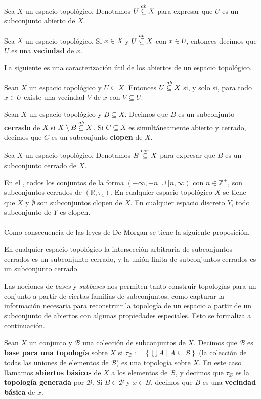 \begin{Not}
    Sea $X$ un espacio topológico. Denotamos $U\stackrel{ab}{\subseteq} X$ para expresar que $U$ es un subconjunto abierto de $X$.
\end{Not}
\begin{Def}
   Sea $X$ un espacio topológico. Si $x\in X$ y $U\stackrel{ab}{\subseteq} X$ con $x\in U$, entonces decimos que $U$ es una \textbf{vecindad} de $x$. 
\end{Def}
La siguiente es una caracterización útil de los abiertos de un espacio topológico.
\begin{Prop}\label{Prop:Caracterizacion_abiertos}
   Sean $X$ un espacio topológico y $U\subseteq X$. Entonces $U\stackrel{ab}{\subseteq} X$ si, y solo si, para todo $x\in U$ existe una vecindad $V$ de $x$ con $V\subseteq U$.
\end{Prop}
\begin{Def}
   Sean $X$ un espacio topológico y $B\subseteq X$. Decimos que $B$ es un subconjunto \textbf{cerrado} de $X$ si $X\setminus B \stackrel{ab}{\subseteq} X$. Si $C\subseteq X$ es simultáneamente abierto y cerrado, decimos que $C$ es un subconjunto \textbf{clopen} de $X$. 
\end{Def}
\begin{Not}
   Sea $X$ un espacio topológico. Denotamos $B\stackrel{cer}{\subseteq} X$ para expresar que $B$ es un subconjunto cerrado de $X$.
\end{Not}
En el , todos los conjuntos de la forma $(-\infty,-n]\cup [n,\infty)$ con $n\in \mathbb{Z}^+$, son subconjuntos cerrados de $(\mathbb{R},\tau_4)$. En cualquier espacio topológico $X$ se tiene que $X$ y $\emptyset$ son subconjuntos clopen de $X$. En cualquier espacio discreto $Y$, todo subconjunto de $Y$ es clopen.\\\\
Como consecuencia de las leyes de De Morgan se tiene la siguiente proposición.
\begin{Prop}
   En cualquier espacio topológico la intersección arbitraria de subconjuntos cerrados es un subconjunto cerrado, y la unión finita de subconjuntos cerrados es un subconjunto cerrado.
\end{Prop}
Las nociones de \textit{bases} y \textit{subbases} nos permiten tanto construir topologías para un conjunto a partir de ciertas familias de subconjuntos, como capturar la información necesaria para reconstruir la topología de un espacio a partir de un subconjunto de abiertos con algunas propiedades especiales. Esto se formaliza a continuación. 
\begin{Def}
   Sean $X$ un conjunto y $\mathcal{B}$ una colección de subconjuntos de $X$. Decimos que $\mathcal{B}$ es \textbf{base para una topología} sobre $X$ si $\tau_\mathcal{B}:=\left\lbrace \bigcup A \mid A\subseteq \mathcal{B}\right\rbrace$ (la colección de todas las uniones de elementos de $\mathcal{B}$) es una topología sobre $X$. En este caso llamamos \textbf{abiertos básicos} de $X$ a los elementos de $\mathcal{B}$, y decimos que $\tau_\mathcal{B}$ es la \textbf{topología generada} por $\mathcal{B}$. Si $B\in\mathcal{B}$ y $x\in B$, decimos que $B$ es una \textbf{vecindad básica} de $x$.
\end{Def}
